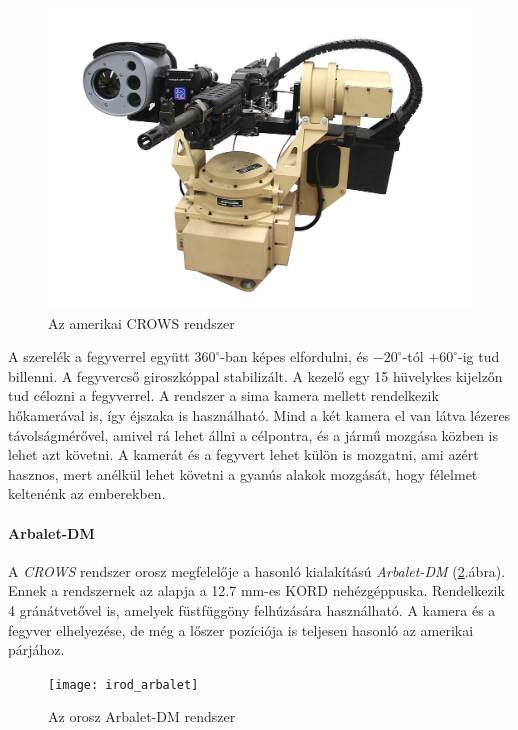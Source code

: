 \documentclass[12pt,a4paper]{article}
\begin{document}
\begin{figure}[h!]
	\centering
	\includegraphics[width=1\linewidth]{irod_crows}
	\caption{Az amerikai CROWS rendszer}
	\label{fig:irod_crows}
\end{figure}

A szerelék a fegyverrel együtt $360^\circ$-ban képes elfordulni, és $-20^{\circ}$-tól $+60^{\circ}$-ig tud billenni. A fegyvercső giroszkóppal stabilizált. A kezelő egy 15 hüvelykes kijelzőn tud célozni a fegyverrel. A rendszer a sima kamera mellett rendelkezik hőkamerával is, így éjszaka is használható. Mind a két kamera el van látva lézeres távolságmérővel, amivel rá lehet állni a célpontra, és a jármű mozgása közben is lehet azt követni. A kamerát és a fegyvert lehet külön is mozgatni, ami azért hasznos, mert anélkül lehet követni a gyanús alakok mozgását, hogy félelmet keltenénk az emberekben.

\paragraph{Arbalet-DM \cite{arbalet}}
A \textsl{CROWS} rendszer orosz megfelelője a hasonló kialakítású \textsl{Arbalet-DM} (\ref{fig:irod_arbalet}.ábra). Ennek a rendszernek az alapja a 12.7 mm-es KORD nehézgéppuska. Rendelkezik 4 gránátvetővel is, amelyek füstfüggöny felhúzására használható. A kamera és a fegyver elhelyezése, de még a lőszer pozíciója is teljesen hasonló az amerikai párjához.

\begin{figure}[h!]
	\centering
	\texttt{[image: irod\_arbalet]}
	\caption{Az orosz Arbalet-DM rendszer}
	\label{fig:irod_arbalet}
\end{figure}
\end{document}
